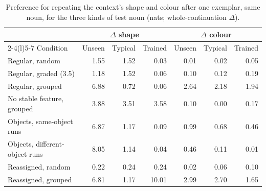 \begin{table}[!htbp]
\centering\small
\caption{Preference for repeating the context's shape and colour after one exemplar, same noun, for the three kinds of test noun (nats; whole-continuation $\Delta$).}
\label{tab:L2}
\begin{tabular}{@{}lrrrrrr@{}}
\toprule
 & \multicolumn{3}{c}{$\Delta$ shape} & \multicolumn{3}{c}{$\Delta$ colour} \\
\cmidrule(lr){2-4}\cmidrule(l){5-7}
Condition & Unseen & Typical & Trained & Unseen & Typical & Trained \\
\midrule
Regular, random & \textminus{}1.55 & \textminus{}1.52 & 0.03 & 0.01 & 0.02 & 0.05 \\
Regular, graded (3.5) & 1.18 & \textminus{}1.52 & 0.06 & \textminus{}0.10 & \textminus{}0.12 & 0.19 \\
Regular, grouped & 6.88 & \textminus{}0.72 & 0.06 & \textminus{}2.64 & \textminus{}2.18 & \textminus{}1.94 \\
No stable feature, grouped & \textminus{}3.88 & \textminus{}3.51 & \textminus{}3.58 & 0.10 & 0.00 & 0.17 \\
Objects, same-object runs & 6.87 & \textminus{}1.17 & \textminus{}0.09 & 0.99 & 0.68 & 0.46 \\
Objects, different-object runs & 8.05 & \textminus{}1.14 & 0.04 & 0.46 & 0.11 & 0.01 \\
Reassigned, random & 0.22 & 0.24 & 0.24 & 0.02 & 0.06 & 0.10 \\
Reassigned, grouped & 6.81 & 1.17 & 10.01 & \textminus{}2.99 & \textminus{}2.70 & \textminus{}1.65 \\
\bottomrule
\end{tabular}
\end{table}

